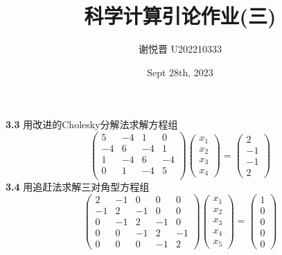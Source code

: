 \documentclass[a4paper,11pt,UTF8]{article}
\title{科学计算引论作业(三)}
\author{谢悦晋 \quad U202210333}
\date{Sept 28th, 2023 }
\begin{document}
\maketitle
\noindent\textbf{3.3} 用改进的Cholesky分解法求解方程组
$$
\begin{pmatrix}5&-4&1&0\\-4&6&-4&1\\1&-4&6&-4\\0&1&-4&5\\\end{pmatrix}\begin{pmatrix}x_1\\x_2\\x_3\\x_4\end{pmatrix}=\begin{pmatrix}2\\-1\\-1\\2\end{pmatrix}
$$
\textbf{3.4} 用追赶法求解三对角型方程组
$$
\begin{pmatrix}2&-1&0&0&0\\-1&2&-1&0&0\\0&-1&2&-1&0\\0&0&-1&2&-1\\0&0&0&-1&2\end{pmatrix}\begin{pmatrix}x_1\\x_2\\x_3\\x_4\\x_5\end{pmatrix}=\begin{pmatrix}1\\0\\0\\0\\0\end{pmatrix}
$$
\end{document}

